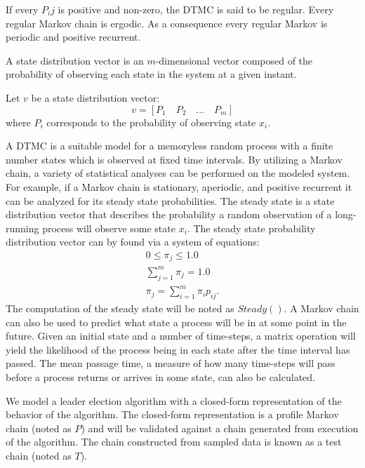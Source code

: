 If every $P_ij$ is positive and non-zero, the DTMC is said to be regular.
Every regular Markov chain is ergodic.
As a consequence every regular Markov is periodic and positive recurrent.

\begin{pdef}
A state distribution vector is an $m$-dimensional vector composed of the probability of observing each state in the system at a given instant.
\end{pdef}

Let $v$ be a state distribution vector:
\[ v = [P_{1} \quad P_{2} \quad \ldots \quad P_{m} ] \]
where $P_{i}$ corresponds to the probability of observing state $x_i$.

A \ac{DTMC} is a suitable model for a memoryless random process with a finite number states which is observed at fixed time intervals.
By utilizing a Markov chain, a variety of statistical analyses can be performed on the modeled system.
For example, if a Markov chain is stationary, aperiodic, and positive recurrent it can be analyzed for its steady state probabilities.
The steady state is a state distribution vector that describes the probability a random observation of a long-running process will observe some state $x_i$.
The steady state probability distribution vector can by found via a system of equations: \cite{MARKOV3}
\begin{align}
0\leq\pi_j\leq1.0 \\
\sum_{j = 1}^{m}\pi_j = 1.0 \\
\pi_j = \sum_{i=1}^{m} \pi_i p_{ij}.
\end{align}
The computation of the steady state will be noted as $Steady()$.
A Markov chain can also be used to predict what state a process will be in at some point in the future.
Given an initial state and a number of time-steps, a matrix operation will yield the likelihood of the process being in each state after the time interval has passed.
The mean passage time, a measure of how many time-steps will pass before a process returns or arrives in some state, can also be calculated.

We model a leader election algorithm with a closed-form representation of the behavior of the algorithm.
The closed-form representation is a profile Markov chain (noted as $P$) and will be validated against a chain generated from execution of the algorithm.
The chain constructed from sampled data is known as a test chain (noted as $T$).

